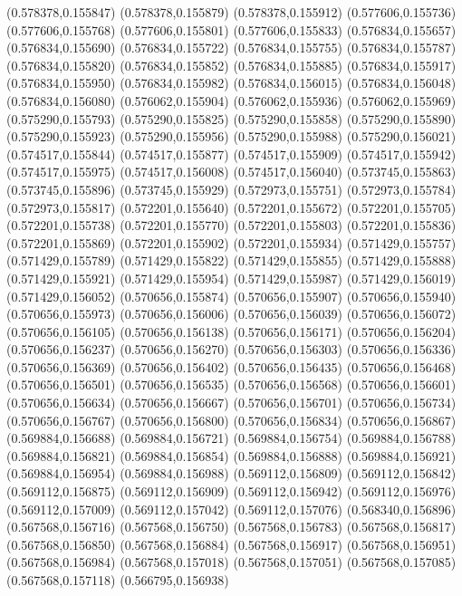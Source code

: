 (0.578378,0.155847)
(0.578378,0.155879)
(0.578378,0.155912)
(0.577606,0.155736)
(0.577606,0.155768)
(0.577606,0.155801)
(0.577606,0.155833)
(0.576834,0.155657)
(0.576834,0.155690)
(0.576834,0.155722)
(0.576834,0.155755)
(0.576834,0.155787)
(0.576834,0.155820)
(0.576834,0.155852)
(0.576834,0.155885)
(0.576834,0.155917)
(0.576834,0.155950)
(0.576834,0.155982)
(0.576834,0.156015)
(0.576834,0.156048)
(0.576834,0.156080)
(0.576062,0.155904)
(0.576062,0.155936)
(0.576062,0.155969)
(0.575290,0.155793)
(0.575290,0.155825)
(0.575290,0.155858)
(0.575290,0.155890)
(0.575290,0.155923)
(0.575290,0.155956)
(0.575290,0.155988)
(0.575290,0.156021)
(0.574517,0.155844)
(0.574517,0.155877)
(0.574517,0.155909)
(0.574517,0.155942)
(0.574517,0.155975)
(0.574517,0.156008)
(0.574517,0.156040)
(0.573745,0.155863)
(0.573745,0.155896)
(0.573745,0.155929)
(0.572973,0.155751)
(0.572973,0.155784)
(0.572973,0.155817)
(0.572201,0.155640)
(0.572201,0.155672)
(0.572201,0.155705)
(0.572201,0.155738)
(0.572201,0.155770)
(0.572201,0.155803)
(0.572201,0.155836)
(0.572201,0.155869)
(0.572201,0.155902)
(0.572201,0.155934)
(0.571429,0.155757)
(0.571429,0.155789)
(0.571429,0.155822)
(0.571429,0.155855)
(0.571429,0.155888)
(0.571429,0.155921)
(0.571429,0.155954)
(0.571429,0.155987)
(0.571429,0.156019)
(0.571429,0.156052)
(0.570656,0.155874)
(0.570656,0.155907)
(0.570656,0.155940)
(0.570656,0.155973)
(0.570656,0.156006)
(0.570656,0.156039)
(0.570656,0.156072)
(0.570656,0.156105)
(0.570656,0.156138)
(0.570656,0.156171)
(0.570656,0.156204)
(0.570656,0.156237)
(0.570656,0.156270)
(0.570656,0.156303)
(0.570656,0.156336)
(0.570656,0.156369)
(0.570656,0.156402)
(0.570656,0.156435)
(0.570656,0.156468)
(0.570656,0.156501)
(0.570656,0.156535)
(0.570656,0.156568)
(0.570656,0.156601)
(0.570656,0.156634)
(0.570656,0.156667)
(0.570656,0.156701)
(0.570656,0.156734)
(0.570656,0.156767)
(0.570656,0.156800)
(0.570656,0.156834)
(0.570656,0.156867)
(0.569884,0.156688)
(0.569884,0.156721)
(0.569884,0.156754)
(0.569884,0.156788)
(0.569884,0.156821)
(0.569884,0.156854)
(0.569884,0.156888)
(0.569884,0.156921)
(0.569884,0.156954)
(0.569884,0.156988)
(0.569112,0.156809)
(0.569112,0.156842)
(0.569112,0.156875)
(0.569112,0.156909)
(0.569112,0.156942)
(0.569112,0.156976)
(0.569112,0.157009)
(0.569112,0.157042)
(0.569112,0.157076)
(0.568340,0.156896)
(0.567568,0.156716)
(0.567568,0.156750)
(0.567568,0.156783)
(0.567568,0.156817)
(0.567568,0.156850)
(0.567568,0.156884)
(0.567568,0.156917)
(0.567568,0.156951)
(0.567568,0.156984)
(0.567568,0.157018)
(0.567568,0.157051)
(0.567568,0.157085)
(0.567568,0.157118)
(0.566795,0.156938)
